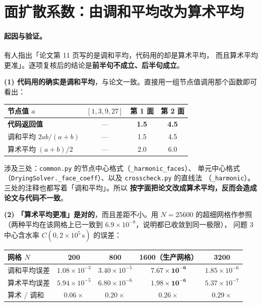 \documentclass[11pt,a4paper]{ctexart}
\newcommand{\src}[1]{\texttt{#1}}
\begin{document}
\section{面扩散系数：由调和平均改为算术平均}

\paragraph{起因与验证。}有人指出「论文第 11 页写的是调和平均，代码用的却是算术平均，
而且算术平均更准」。逐项复核后的结论是\textbf{前半句不成立、后半句成立}。

\textbf{(1) 代码用的确实是调和平均}，与论文一致。直接用一组节点值调用那个函数即可看出：

\begin{center}
\small
\begin{tabular}{@{}lccc@{}}
\toprule
节点值 $a$ & $[1,3,9,27]$ & 第 1 面 & 第 2 面 \\
\midrule
\textbf{代码返回值} & --- & \textbf{1.5} & \textbf{4.5} \\
调和平均 $2ab/(a+b)$ & --- & 1.5 & 4.5 \\
算术平均 $(a+b)/2$ & --- & 2.0 & 6.0 \\
\bottomrule
\end{tabular}
\end{center}

\noindent 涉及三处：\src{common.py} 的节点中心格式（\src{\_harmonic\_faces}）、
单元中心格式（\src{DryingSolver.\_face\_coeff}）、以及 \src{crosscheck.py} 的直线法
（\src{\_harmonic}）。三处的注释也都写着「调和平均」。所以
\textbf{按字面把论文改成算术平均，反而会造成论文与代码不一致}。

\textbf{(2) 「算术平均更准」是对的}，而且差距不小。用 $N=25600$ 的超细网格作参照
（两种平均在该网格上已一致到 $6.9\times10^{-8}$，说明都已收敛到同一极限），
问题 3 中心含水率 $C(0,2\times10^5\,\mathrm{s})$ 的误差：

\begin{center}
\small
\begin{tabular}{@{}lcccc@{}}
\toprule
网格 $N$ & 200 & 800 & \textbf{1600（生产网格）} & 3200 \\
\midrule
调和平均误差 & $1.08\times10^{-3}$ & $3.40\times10^{-5}$ & $\mathbf{7.67\times10^{-6}}$ & $1.85\times10^{-6}$ \\
算术平均误差 & $5.94\times10^{-5}$ & $6.80\times10^{-6}$ & $\mathbf{1.98\times10^{-6}}$ & $5.37\times10^{-7}$ \\
算术 / 调和 & $0.06\times$ & $0.20\times$ & $\mathbf{0.26\times}$ & $0.29\times$ \\
\bottomrule
\end{tabular}
\end{center}
\end{document}
